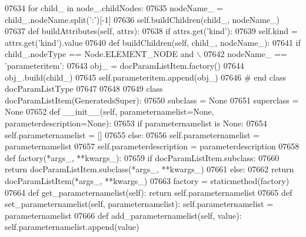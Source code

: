 \begin{DoxyCode}
{{{{{{{{{{{{{{{{{{{{{{{{{{{{{{{{{{{{{{{{{{{{{{{{{{{{{{{{{{{{{{{{{{{{{{{{{{{{{{{{{{{{{{{{{{{{{{{{{{{{{{{{{{{{{{{{{{{{{{{{{{{{{{{{{{{{{{{{{{{{{{{{{{{{{{{{{{{{{{{{{{{{{{{{{{{{{{{{{{{{{{{{{{{{{{{{{{{{{{{{{{{{{{{{{{{{{{{{{{{{{{{{{{{{{{{{{{{{{{{{{{{{{{{{{{{{{{{{{{{{{{{{{{{{{{{{{{{{{{{{{{{{{{{{{{{{{{{{{{{{{{{{{{{{{{{{{{{{{{{{{{{{{{{{{{{{{{{{{{{{{{{{{{{{{{{{{{{{{{{{{{{{{{{{{{{{{{{{{{{{{{{{{{{{{{{{{{{{{{{{{{{{{{{{{{{{{{{{{{{{{{{{{{{{{{{{{{{{{{{{{{{{{{{{{{{{{{{{{{{{{{{{{{{{{{{{{{{{{{07634         \textcolor{keywordflow}{for} child\_ \textcolor{keywordflow}{in} node\_.childNodes:
07635             nodeName\_ = child\_.nodeName.split(\textcolor{stringliteral}{':'})[-1]
07636             self.buildChildren(child\_, nodeName\_)
07637     \textcolor{keyword}{def }buildAttributes(self, attrs):
07638         \textcolor{keywordflow}{if} attrs.get(\textcolor{stringliteral}{'kind'}):
07639             self.kind = attrs.get(\textcolor{stringliteral}{'kind'}).value
07640     \textcolor{keyword}{def }buildChildren(self, child\_, nodeName\_):
07641         \textcolor{keywordflow}{if} child\_.nodeType == Node.ELEMENT\_NODE \textcolor{keywordflow}{and} \(\backslash\)
07642             nodeName\_ == \textcolor{stringliteral}{'parameteritem'}:
07643             obj\_ = docParamListItem.factory()
07644             obj\_.build(child\_)
07645             self.parameteritem.append(obj\_)
07646 \textcolor{comment}{# end class docParamListType}
07647 
07648 
07649 \textcolor{keyword}{class }docParamListItem(GeneratedsSuper):
07650     subclass = \textcolor{keywordtype}{None}
07651     superclass = \textcolor{keywordtype}{None}
07652     \textcolor{keyword}{def }__init__(self, parameternamelist=None, parameterdescription=None):
07653         \textcolor{keywordflow}{if} parameternamelist \textcolor{keywordflow}{is} \textcolor{keywordtype}{None}:
07654             self.parameternamelist = []
07655         \textcolor{keywordflow}{else}:
07656             self.parameternamelist = parameternamelist
07657         self.parameterdescription = parameterdescription
07658     \textcolor{keyword}{def }factory(*args\_, **kwargs\_):
07659         \textcolor{keywordflow}{if} docParamListItem.subclass:
07660             \textcolor{keywordflow}{return} docParamListItem.subclass(*args\_, **kwargs\_)
07661         \textcolor{keywordflow}{else}:
07662             \textcolor{keywordflow}{return} docParamListItem(*args\_, **kwargs\_)
07663     factory = staticmethod(factory)
07664     \textcolor{keyword}{def }get_parameternamelist(self): \textcolor{keywordflow}{return} self.parameternamelist
07665     \textcolor{keyword}{def }set_parameternamelist(self, parameternamelist): self.parameternamelist = parameternamelist
07666     \textcolor{keyword}{def }add_parameternamelist(self, value): self.parameternamelist.append(value)
}}}}}}}}}}}}}}}}}}}}}}}}}}}}}}}}}}}}}}}}}}}}}}}}}}}}}}}}}}}}}}}}}}}}}}}}}}}}}}}}}}}}}}}}}}}}}}}}}}}}}}}}}}}}}}}}}}}}}}}}}}}}}}}}}}}}}}}}}}}}}}}}}}}}}}}}}}}}}}}}}}}}}}}}}}}}}}}}}}}}}}}}}}}}}}}}}}}}}}}}}}}}}}}}}}}}}}}}}}}}}}}}}}}}}}}}}}}}}}}}}}}}}}}}}}}}}}}}}}}}}}}}}}}}}}}}}}}}}}}}}}}}}}}}}}}}}}}}}}}}}}}}}}}}}}}}}}}}}}}}}}}}}}}}}}}}}}}}}}}}}}}}}}}}}}}}}}}}}}}}}}}}}}}}}}}}}}}}}}}}}}}}}}}}}}}}}}}}}}}}}}}}}}}}}}}}}}}}}}}}}}}}}}}}}}}}}}}}}}}}}}}}}}}}}}}}}}}}}}}}}}}}}}}}}}}}}}}}}}
\end{DoxyCode}
